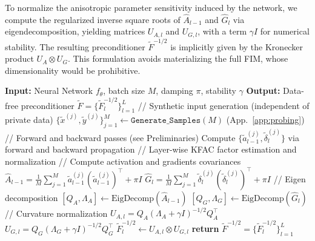 \documentclass{article}
\theoremstyle{plain}
\theoremstyle{definition}
\theoremstyle{remark}
\begin{document}
To normalize the anisotropic parameter sensitivity induced by the network, we compute the regularized inverse square roots of
$\hat{A}_{l-1}$ and $\hat{G}_l$ via eigendecomposition, yielding matrices $U_{A,l}$ and $U_{G,l}$, with a term $\gamma I$ for numerical stability. 
The resulting preconditioner $\tilde{F}^{-1/2}$ is implicitly given by the Kronecker product $U_{A} \otimes U_{G}$. This formulation avoids materializing the full FIM, whose dimensionality would be prohibitive.

\begin{algorithm}[t]
\caption{DP-KFC Preconditioner Construction (Synthetic Probing)}
\label{alg:data_free_precond}
\begin{algorithmic}[1]
\STATE \textbf{Input:} Neural Network $f_\theta$, batch size $M$, damping $\pi$, stability $\gamma$
\STATE \textbf{Output:} Data-free preconditioner $\tilde{F} = \{\tilde{F}_l^{-1/2}\}_{l=1}^L$
\STATE \textcolor{auburn}{// Synthetic input generation (independent of private data)}
\STATE $\{\tilde{x}^{(j)}, \tilde{y}^{(j)}\}_{j=1}^M \gets \texttt{Generate\_Samples}(M)$ \hfill (App.~\ref{app:probing})
\STATE \textcolor{auburn}{// Forward and backward passes (see Preliminaries)}
\STATE Compute $\{\tilde{a}_{l-1}^{(j)}, \tilde{\delta}_l^{(j)}\}$ via forward and backward propagation
\STATE \textcolor{auburn}{// Layer-wise KFAC factor estimation and normalization}
    \STATE \textcolor{auburn}{// Compute activation and gradients covariances} 
    \STATE $\hat{A}_{l-1} = \frac{1}{M} \sum_{j=1}^M \tilde{a}_{l-1}^{(j)} (\tilde{a}_{l-1}^{(j)})^\top + \pi I$
    \STATE $\hat{G}_l = \frac{1}{M} \sum_{j=1}^M \tilde{\delta}_l^{(j)} (\tilde{\delta}_l^{(j)})^\top + \pi I$
    \STATE \textcolor{auburn}{// Eigen decomposition}
    \STATE $[Q_A, \Lambda_A] \gets \text{EigDecomp}(\hat{A}_{l-1})$
    \STATE $[Q_G, \Lambda_G] \gets \text{EigDecomp}(\hat{G}_l)$
    \STATE \textcolor{auburn}{// Curvature normalization}
    \STATE $U_{A,l} = Q_A (\Lambda_A + \gamma I)^{-1/2} Q_A^\top$
    \STATE $U_{G,l} = Q_G (\Lambda_G + \gamma I)^{-1/2} Q_G^\top$
    \STATE $\tilde{F}_l^{-1/2} \gets U_{A,l} \otimes U_{G,l}$
\ENDFOR
\STATE \textbf{return} $\tilde{F}^{-1/2} = \{\tilde{F}_l^{-1/2}\}_{l=1}^L$
\end{algorithmic}
\end{algorithm}
\end{document}
